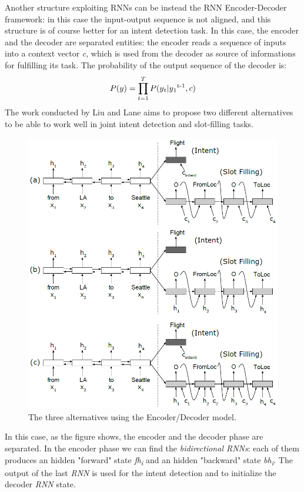 \documentclass[a4paper,12pt]{report}
\begin{document}
	Another structure exploiting RNNs can be instead the RNN Encoder-Decoder framework: in this case the input-output sequence is not aligned, and this structure is of course better for an intent detection task. In this case, the encoder and the decoder are separated entities: the encoder reads a sequence of inputs into a context vector \textit{c}, which is used from the decoder as source of informations for fulfilling its task. The probability of the output sequence of the decoder is:
	\begin{equation}
	P(y) = \prod_{t=1}^{T} P(y\textsubscript{t}|y\textsubscript{1}\textsuperscript{t-1},c)
	\end{equation}
	The work conducted by Liu and Lane aims to propose two different alternatives to be able to work well in joint intent detection and slot-filling tasks.
	\begin{figure}[H]
		\centering
		\includegraphics[scale=0.4]{alt1}
		\caption{The three alternatives using the Encoder/Decoder model.}
	\end{figure}
	In this case, as the figure shows, the encoder and the decoder phase are separated. In the encoder phase we can find the \textit{bidirectional RNNs}: each of them produces an hidden "forward" state \textit{fh\textsubscript{i}} and an hidden "backward" state \textit{bh\textsubscript{i}}. The output of the last \textit{RNN} is used for the intent detection and to initialize the decoder \textit{RNN} state.\\\\
\end{document}
